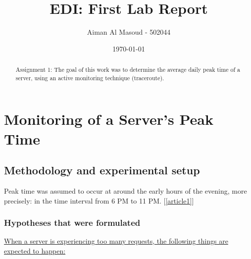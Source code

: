 \documentclass[a4paper,10pt]{article}
\begin{document}
\title{EDI: First Lab Report}
\author{Aiman Al Masoud - 502044}
\date{\today}

\maketitle

\begin{abstract}

Assignment 1: The goal of this work was to determine the average daily peak time of a server, using an active monitoring technique (traceroute).

\end{abstract}

\clearpage

\setcounter{page}{1}

\section{Monitoring of a Server's Peak Time}


\subsection{Methodology and experimental setup}


Peak time was assumed to occur at around the early hours of the evening, more precisely: in the time interval from 6 PM to 11 PM. [\ref{article1}]


\maketitle
\subsubsection{Hypotheses that were formulated}



\underline{When a server is experiencing too many requests, the following things are expected to happen: }
\end{document}
